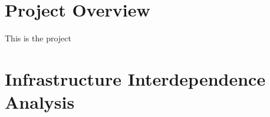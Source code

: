 \documentclass[11pt,a4paper]{article}
\begin{document}
\graphicspath{ {../figures/} }

\maketitle

\section{Project Overview}
This is the project
\section{Infrastructure Interdependence Analysis}
\end{document}
